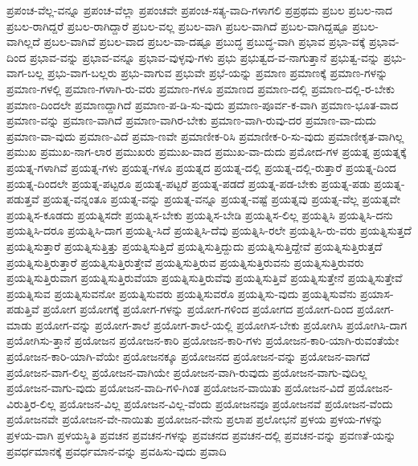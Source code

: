 {ಪ್ರಪಂಚ-ವೆಲ್ಲ-ವನ್ನೂ
ಪ್ರಪಂಚ-ವೆಲ್ಲಾ
ಪ್ರಪಂಚವೇ
ಪ್ರಪಂಚ-ಸತ್ಯ-ವಾದಿ-ಗಳಾಗಲಿ
ಪ್ರಪ್ರಥಮ
ಪ್ರಬಲ
ಪ್ರಬಲ-ನಾದ
ಪ್ರಬಲ-ರಾಗಿದ್ದರೆ
ಪ್ರಬಲ-ರಾಗಿದ್ದಾರೆ
ಪ್ರಬಲ-ವಲ್ಲ
ಪ್ರಬಲ-ವಾಗಿ
ಪ್ರಬಲ-ವಾಗಿದೆ
ಪ್ರಬಲ-ವಾಗಿದ್ದಷ್ಟೂ
ಪ್ರಬಲ-ವಾಗಿಲ್ಲದೆ
ಪ್ರಬಲ-ವಾಗಿವೆ
ಪ್ರಬಲ-ವಾದ
ಪ್ರಬಲ-ವಾ-ದಷ್ಟೂ
ಪ್ರಬುದ್ಧ
ಪ್ರಬುದ್ಧ-ವಾಗಿ
ಪ್ರಭಾವ
ಪ್ರಭಾ-ವಕ್ಕೆ
ಪ್ರಭಾವ-ದಿಂದ
ಪ್ರಭಾವ-ವನ್ನು
ಪ್ರಭಾವ-ವನ್ನೂ
ಪ್ರಭಾವ-ವುಳ್ಳವು-ಗಳು
ಪ್ರಭು
ಪ್ರಭುತ್ವದ-ವ-ನಾಗುತ್ತಾನೆ
ಪ್ರಭುತ್ವ-ವನ್ನು
ಪ್ರಭು-ವಾಗ-ಬಲ್ಲ
ಪ್ರಭು-ವಾಗ-ಬಲ್ಲರು
ಪ್ರಭು-ವಾಗುವ
ಪ್ರಭುವೇ
ಪ್ರಭೆ-ಯನ್ನು
ಪ್ರಮಾಣ
ಪ್ರಮಾಣಕ್ಕೆ
ಪ್ರಮಾಣ-ಗಳನ್ನು
ಪ್ರಮಾಣ-ಗಳಲ್ಲಿ
ಪ್ರಮಾಣ-ಗಳಾಗಿ-ರು-ವರು
ಪ್ರಮಾಣ-ಗಳೂ
ಪ್ರಮಾಣದ
ಪ್ರಮಾಣ-ದಲ್ಲಿ
ಪ್ರಮಾಣ-ದಲ್ಲಿ-ರ-ಬೇಕು
ಪ್ರಮಾಣ-ದಿಂದಲೇ
ಪ್ರಮಾಣದ್ದಾಗಿದೆ
ಪ್ರಮಾಣ-ಪ-ಡಿ-ಸು-ವುದು
ಪ್ರಮಾಣ-ಪೂರ್ವ-ಕ-ವಾಗಿ
ಪ್ರಮಾಣ-ಭೂತ-ವಾದ
ಪ್ರಮಾಣ-ವನ್ನು
ಪ್ರಮಾಣ-ವಾಗಿದೆ
ಪ್ರಮಾಣ-ವಾಗಿರ-ಬೇಕು
ಪ್ರಮಾಣ-ವಾಗಿ-ರುವು-ದರ
ಪ್ರಮಾಣ-ವಾ-ದುದು
ಪ್ರಮಾಣ-ವಾ-ವುದು
ಪ್ರಮಾಣ-ವಿದೆ
ಪ್ರಮಾ-ಣವೇ
ಪ್ರಮಾಣೀಕ-ರಿಸಿ
ಪ್ರಮಾಣೀಕ-ರಿ-ಸು-ವುದು
ಪ್ರಮಾಣೀಕೃತ-ವಾಗಿಲ್ಲ
ಪ್ರಮುಖ
ಪ್ರಮುಖ-ನಾಗ-ಲಾರ
ಪ್ರಮುಖರು
ಪ್ರಮುಖ-ವಾದ
ಪ್ರಮುಖ-ವಾ-ದುದು
ಪ್ರಮೋದ-ಗಳ
ಪ್ರಯತ್ನ
ಪ್ರಯತ್ನಕ್ಕೆ
ಪ್ರಯತ್ನ-ಗಳಾಗಿವೆ
ಪ್ರಯತ್ನ-ಗಳು
ಪ್ರಯತ್ನ-ಗಳೂ
ಪ್ರಯತ್ನದ
ಪ್ರಯತ್ನ-ದಲ್ಲಿ
ಪ್ರಯತ್ನ-ದಲ್ಲಿ-ರುತ್ತಾರೆ
ಪ್ರಯತ್ನ-ದಿಂದ
ಪ್ರಯತ್ನ-ದಿಂದಲೇ
ಪ್ರಯತ್ನ-ಪಟ್ಟರೂ
ಪ್ರಯತ್ನ-ಪಟ್ಟರೆ
ಪ್ರಯತ್ನ-ಪಡದೆ
ಪ್ರಯತ್ನ-ಪಡ-ಬೇಕು
ಪ್ರಯತ್ನ-ಪಡು
ಪ್ರಯತ್ನ-ಪಡುತ್ತವೆ
ಪ್ರಯತ್ನ-ವನ್ನಂತೂ
ಪ್ರಯತ್ನ-ವನ್ನು
ಪ್ರಯತ್ನ-ವನ್ನೂ
ಪ್ರಯತ್ನ-ವಷ್ಟೆ
ಪ್ರಯತ್ನವು
ಪ್ರಯತ್ನ-ವೆಲ್ಲ
ಪ್ರಯತ್ನವೇ
ಪ್ರಯತ್ನಿಸ-ಕೂಡದು
ಪ್ರಯತ್ನಿಸದೇ
ಪ್ರಯತ್ನಿಸ-ಬೇಕು
ಪ್ರಯತ್ನಿಸ-ಬೇಡಿ
ಪ್ರಯತ್ನಿಸ-ಲಿಲ್ಲ
ಪ್ರಯತ್ನಿಸಿ
ಪ್ರಯತ್ನಿಸಿ-ದನು
ಪ್ರಯತ್ನಿಸಿ-ದರೂ
ಪ್ರಯತ್ನಿಸಿ-ದಾಗ
ಪ್ರಯತ್ನಿ-ಸಿದೆ
ಪ್ರಯತ್ನಿಸಿ-ದೆವು
ಪ್ರಯತ್ನಿಸಿ-ರಲೇ
ಪ್ರಯತ್ನಿಸಿ-ರು-ವರು
ಪ್ರಯತ್ನಿಸುತ್ತದೆ
ಪ್ರಯತ್ನಿಸುತ್ತಾರೆ
ಪ್ರಯತ್ನಿಸುತ್ತಿತ್ತು
ಪ್ರಯತ್ನಿಸುತ್ತಿದೆ
ಪ್ರಯತ್ನಿಸುತ್ತಿದ್ದುದು
ಪ್ರಯತ್ನಿಸುತ್ತಿದ್ದೇವೆ
ಪ್ರಯತ್ನಿಸುತ್ತಿರುತ್ತದೆ
ಪ್ರಯತ್ನಿಸುತ್ತಿರುತ್ತಾರೆ
ಪ್ರಯತ್ನಿಸುತ್ತಿರುತ್ತೇವೆ
ಪ್ರಯತ್ನಿಸುತ್ತಿರುವ
ಪ್ರಯತ್ನಿಸುತ್ತಿರುವನು
ಪ್ರಯತ್ನಿಸುತ್ತಿರುವರು
ಪ್ರಯತ್ನಿಸುತ್ತಿರುವಾಗ
ಪ್ರಯತ್ನಿಸುತ್ತಿರುವೆಯಾ
ಪ್ರಯತ್ನಿಸುತ್ತಿರುವೆವು
ಪ್ರಯತ್ನಿಸುತ್ತಿವೆ
ಪ್ರಯತ್ನಿಸುತ್ತೇನೆ
ಪ್ರಯತ್ನಿಸುತ್ತೇವೆ
ಪ್ರಯತ್ನಿಸುವ
ಪ್ರಯತ್ನಿಸುವನೋ
ಪ್ರಯತ್ನಿಸುವರು
ಪ್ರಯತ್ನಿಸುವರೊ
ಪ್ರಯತ್ನಿಸು-ವುದು
ಪ್ರಯತ್ನಿಸುವೆನು
ಪ್ರಯಾಸ-ಪಡುತ್ತಿವೆ
ಪ್ರಯೋಗ
ಪ್ರಯೋಗಕ್ಕೆ
ಪ್ರಯೋಗ-ಗಳನ್ನು
ಪ್ರಯೋಗ-ಗಳಿಂದ
ಪ್ರಯೋಗದ
ಪ್ರಯೋಗ-ದಿಂದ
ಪ್ರಯೋಗ-ಮಾಡು
ಪ್ರಯೋಗ-ವನ್ನು
ಪ್ರಯೋಗ-ಶಾಲೆ
ಪ್ರಯೋಗ-ಶಾಲೆ-ಯಲ್ಲಿ
ಪ್ರಯೋಗಿಸ-ಬೇಕು
ಪ್ರಯೋಗಿಸಿ
ಪ್ರಯೋಗಿಸಿ-ದಾಗ
ಪ್ರಯೋಗಿಸು-ತ್ತಾನೆ
ಪ್ರಯೋಜನ
ಪ್ರಯೋಜನ-ಕಾರಿ
ಪ್ರಯೋಜನ-ಕಾರಿ-ಗಳು
ಪ್ರಯೋಜನ-ಕಾರಿ-ಯಾಗಿ-ರುವಂತೆಯೇ
ಪ್ರಯೋಜನ-ಕಾರಿ-ಯಾಗಿ-ವೆಯೇ
ಪ್ರಯೋಜನಕ್ಕೂ
ಪ್ರಯೋಜನದ
ಪ್ರಯೋಜನ-ವನ್ನು
ಪ್ರಯೋಜನ-ವಾಗದೆ
ಪ್ರಯೋಜನ-ವಾಗ-ಲಿಲ್ಲ
ಪ್ರಯೋಜನ-ವಾಗಿಯೇ
ಪ್ರಯೋಜನ-ವಾಗಿ-ರುವುದು
ಪ್ರಯೋಜನ-ವಾಗು-ವುದಿಲ್ಲ
ಪ್ರಯೋಜನ-ವಾಗು-ವುದು
ಪ್ರಯೋಜನ-ವಾದಿ-ಗಳಿ-ಗಿಂತ
ಪ್ರಯೋಜನ-ವಾಯಿತು
ಪ್ರಯೋಜನ-ವಿದೆ
ಪ್ರಯೋಜನ-ವಿರುತ್ತಿರ-ಲಿಲ್ಲ
ಪ್ರಯೋಜನ-ವಿಲ್ಲ
ಪ್ರಯೋಜನ-ವಿಲ್ಲ-ವೆಂದು
ಪ್ರಯೋಜನವೂ
ಪ್ರಯೋಜನವೆ
ಪ್ರಯೋಜನ-ವೆಂದು
ಪ್ರಯೋಜನವೇ
ಪ್ರಯೋಜನ-ವೇ-ನಾಯಿತು
ಪ್ರಯೋಜನ-ವೇನು
ಪ್ರಲಾಪ
ಪ್ರಲೋಭನೆ
ಪ್ರಳಯ
ಪ್ರಳಯ-ಗಳನ್ನು
ಪ್ರಳಯ-ವಾಗಿ
ಪ್ರಳಯಸ್ಥಿತಿ
ಪ್ರವಚನ
ಪ್ರವಚನ-ಗಳನ್ನು
ಪ್ರವಚನದ
ಪ್ರವಚನ-ದಲ್ಲಿ
ಪ್ರವಚನ-ವನ್ನು
ಪ್ರವಣತೆ-ಯನ್ನು
ಪ್ರವರ್ಧಮಾನಕ್ಕೆ
ಪ್ರವರ್ಧಮಾನ-ವನ್ನು
ಪ್ರವಹಿಸು-ವುದು
ಪ್ರವಾದಿ
}
